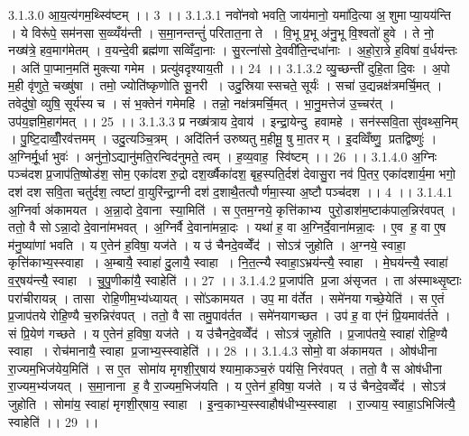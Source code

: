 3.1.3.0
आ॒य॒त्य॑गम॒थ्स्वि॑ष्टम् ।। 3 ।।
3.1.3.1
नवो॑नवो भवति॒ जाय॑मानो॒ यमा॑दि॒त्या अ॒॒शुमाप्या॒यय॑न्ति । ये विरू॑पे॒ सम॑नसा स॒व्व्यँय॑न्ती । स॒मा॒नन्तन्तुं॑ परितात॒ना ते । वि॒भू प्र॒भू अ॑नु॒भू वि॒श्वतो॑ हुवे । ते नो॒ नख्ष॑त्रे॒ हव॒माग॑मेतम् । व॒यन्दे॒वी ब्रह्म॑णा सव्विँदा॒नाः । सु॒रत्ना॑सो दे॒ववी॑ति॒न्दधा॑नाः । अ॒हो॒रा॒त्रे ह॒विषा॑ व॒र्धय॑न्तः । अति॑ पा॒प्मान॒मति॑ मुक्त्या गमेम । प्रत्यु॑वदृश्याय॒ती ।। 24 ।।
3.1.3.2
व्यु॒च्छन्ती॑ दुहि॒ता दि॒वः । अ॒पो म॒ही वृ॑णुते॒ चख्षु॑षा । तमो॒ ज्योति॑ष्कृणोति सू॒नरी । उदु॒स्रियास्सचते॒ सूर्यः॑ । सचा॑ उ॒द्यन्नक्ष॑त्रमर्चि॒मत् । तवेदु॑षो॒ व्युषि॒ सूर्य॑स्य च । सं भ॒क्तेन॑ गमेमहि । तन्नो॒ नक्ष॑त्रमर्चि॒मत् । भा॒नु॒मत्तेज॑ उ॒च्चर॑त् । उप॑य॒ज्ञमि॒हाग॑मत् ।। 25 ।।
3.1.3.3
प्र नख्ष॑त्राय दे॒वाय॑ । इन्द्रा॒येन्दु॑ हवामहे । सन॑स्सवि॒ता सु॑वथ्स॒निम् । पु॒ष्टि॒दाव्वीँ॒रव॑त्तमम् । उदु॒त्यञ्चि॒त्रम् । अदि॑तिर्न उरुष्यतु म॒हीमू॒ षु मा॒तरम् । इ॒दव्विँष्णु॒ प्रतद्विष्णुः॑ । अ॒ग्निर्मू॒र्धा भुवः॑ । अनु॑नो॒ऽद्यानु॑मति॒रन्विद॑नुमते॒ त्वम् । ह॒व्य॒वाह॒॒ स्वि॑ष्टम् ।। 26 ।।
3.1.4.0
अ॒ग्निः पञ्च॑दश प्र॒जाप॑ति॒ष्षोड॑श॒ सोम॒ एका॑दश रु॒द्रो दश॒र्ख्षैका॑दश॒ बृह॒स्पति॒र्दश॑ देवासु॒रा नव॑ पि॒तर॒ एका॑दशार्य॒मा भगो॒ दश॑ दश सवि॒ता चतु॑र्दश॒ त्वष्टा॑ वा॒युरि॑न्द्रा॒ग्नी दश॑ द॒शाथै॒तत्पौर्णमा॒स्या अ॒ष्टौ पञ्च॑दश ।। 4 ।।
3.1.4.1
अ॒ग्निर्वा अ॑कामयत । अ॒न्ना॒दो दे॒वाना॑ स्या॒मिति॑ । स ए॒तम॒ग्नये॒ कृत्ति॑काभ्य पुरो॒डाश॑म॒ष्टाक॑पाल॒न्निर॑वपत् । ततो॒ वै सोऽन्ना॒दो दे॒वाना॑मभवत् । अ॒ग्निर्वै दे॒वाना॑मन्ना॒दः । यथा॑ ह॒ वा अ॒ग्निर्दे॒वाना॑मन्ना॒दः । ए॒व ह॒ वा ए॒ष म॑नु॒ष्या॑णां भवति । य ए॒तेन॑ ह॒विषा॒ यज॑ते । य उ॑ चैनदे॒वव्वेँद॑ । सोऽत्र॑ जुहोति । अ॒ग्नये॒ स्वाहा॒ कृत्ति॑काभ्य॒स्स्वाहा । अ॒म्बायै॒ स्वाहा॑ दु॒लायै॒ स्वाहा । नि॒त॒त्न्यै स्वाहा॒ऽभ्रय॑न्त्यै॒ स्वाहा । मे॒घय॑न्त्यै॒ स्वाहा॑ व॒र्॒षय॑न्त्यै॒ स्वाहा । चु॒पु॒णीका॑यै॒ स्वाहेति॑ ।। 27 ।।
3.1.4.2
प्र॒जाप॑ति प्र॒जा अ॑सृजत । ता अ॑स्माथ्सृ॒ष्टाः परा॑चीरायन्न् । तासा॑ रोहि॒णीम॒भ्य॑ध्यायत् । सो॑ऽकामयत । उप॒ मा व॑र्तेत । समे॑नया गच्छे॒येति॑ । स ए॒तं प्र॒जाप॑तये रोहि॒ण्यै च॒रुन्निर॑वपत् । ततो॒ वै सा तमु॒पाव॑र्तत । समे॑नयागच्छत । उप॑ ह॒ वा ए॑नं प्रि॒यमाव॑र्तते । सं प्रि॒येण॑ गच्छते । य ए॒तेन॑ ह॒विषा॒ यज॑ते । य उ॑चैनदे॒वव्वेँद॑ । सोऽत्र॑ जुहोति । प्र॒जाप॑तये॒ स्वाहा॑ रोहि॒ण्यै स्वाहा । रोच॑मानायै॒ स्वाहा प्र॒जाभ्य॒स्स्वाहेति॑ ।। 28 ।।
3.1.4.3
सोमो॒ वा अ॑कामयत । ओष॑धीना रा॒ज्यम॒भिज॑येय॒मिति॑ । स ए॒त सोमा॑य मृगशी॒र्॒षाय॑ श्यामा॒कञ्च॒रुं पय॑सि॒ निर॑वपत् । ततो॒ वै स ओष॑धीना रा॒ज्यम॒भ्य॑जयत् । स॒मा॒नाना॑ ह॒ वै रा॒ज्यम॒भिज॑यति । य ए॒तेन॑ ह॒विषा॒ यज॑ते । य उ॑ चैनदे॒वव्वेँद॑ । सोऽत्र॑ जुहोति । सोमा॑य॒ स्वाहा॑ मृगशी॒र्‌षाय॒ स्वाहा । इ॒न्व॒काभ्य॒स्स्वाहौष॑धीभ्य॒स्स्वाहा । रा॒ज्याय॒ स्वाहा॒ऽभिजि॑त्यै॒ स्वाहेति॑ ।। 29 ।।

